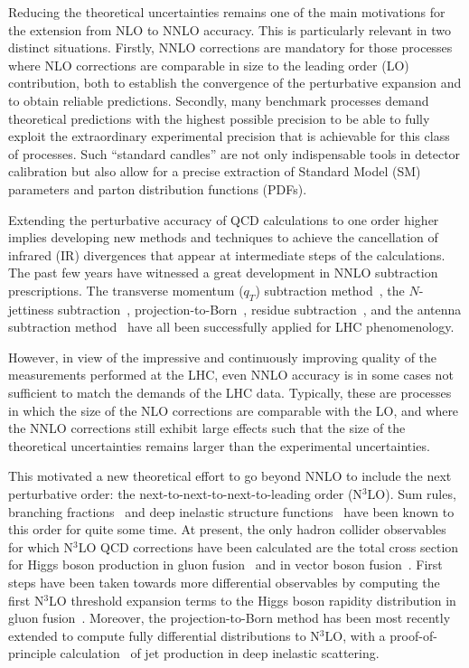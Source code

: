 \documentclass[12pt]{article}
\DeclareRobustCommand{\qt}{q_T}
\begin{document}
Reducing the theoretical uncertainties remains one of the main motivations for the extension from NLO to NNLO accuracy. This is particularly relevant in two distinct situations. Firstly, NNLO corrections are mandatory for those processes where NLO corrections are comparable in size to the leading order (LO) contribution, both to establish the convergence of the perturbative expansion and to obtain reliable predictions. Secondly, many benchmark processes demand theoretical predictions with the highest possible precision to be able to fully exploit the extraordinary experimental precision that is achievable for this class of processes. Such ``standard candles'' are not only indispensable tools in detector calibration but also allow for a precise extraction of Standard Model (SM) parameters and parton distribution functions (PDFs).

Extending the perturbative accuracy of QCD calculations to one order higher implies developing new methods and techniques to achieve the cancellation of infrared (IR) divergences that appear at intermediate steps of the calculations. The past few years have witnessed a great development in NNLO subtraction prescriptions. The transverse momentum ($\qt$) subtraction method~\cite{Catani:2007vq,Bozzi:2005wk,Bonciani:2015sha}, the $N$-jettiness subtraction~\cite{Boughezal:2015eha, Gaunt:2015pea}, projection-to-Born~\cite{Cacciari:2015jma}, residue subtraction~\cite{Czakon:2011ve,Boughezal:2011jf}, and the antenna subtraction method~\cite{Antenna:method} have all been successfully applied for LHC phenomenology. 

However, in view of the impressive and continuously improving quality of the measurements performed at the LHC, even NNLO accuracy is in some cases not sufficient to match the demands of the LHC data. Typically, these are processes in which the size of the NLO corrections are comparable with the LO, and where the NNLO corrections still exhibit large effects such that the size of the theoretical uncertainties remains larger than the experimental uncertainties. 

This motivated a new theoretical effort to go beyond NNLO to include the next perturbative order: the next-to-next-to-next-to-leading order (N$^{3}$LO). Sum rules, branching fractions~\cite{Chetyrkin:1994js} and deep inelastic structure functions~\cite{Vermaseren:2005qc} have been known to this order for quite some time. At present, the only hadron collider observables for which N$^{3}$LO QCD corrections have been calculated are the total cross section for Higgs boson  production in gluon fusion~\cite{Anastasiou:2015ema,Mistlberger:2018etf} and in vector boson 
fusion~\cite{Dreyer:2016oyx}. First steps have been taken towards more differential observables by computing the first N$^{3}$LO threshold expansion terms to the Higgs boson rapidity distribution in gluon fusion~\cite{Dulat:2017prg}. Moreover, the projection-to-Born method has been most recently extended to compute fully differential distributions to N$^{3}$LO, with a proof-of-principle calculation~\cite{Currie:2018fgr} of jet production in deep inelastic scattering. 
\end{document}
